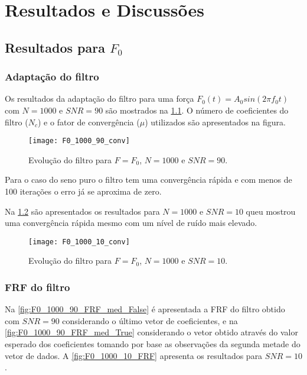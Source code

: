 \chapter{Resultados e Discussões}

\section{Resultados para $ F_0 $}\label{sec_F_0}
\subsection{Adaptação do filtro}

Os resultados da adaptação do filtro para uma força $F_0(t) = A_0 sin(2\pi f_0 t)$ com $ N=1000 $  e $ SNR = 90 $ são mostrados na \cref{fig:F0_1000_90_conv}. O número de coeficientes do filtro ($ N_c $) e o fator de convergência ($ \mu $) utilizados são apresentados na figura.

\begin{figure}[!h]
	\centering
	\texttt{[image: F0\_1000\_90\_conv]}
	\caption{Evolução do filtro para $ F=F_0 $, $ N=1000 $ e $ SNR=90 $.}
	\label{fig:F0_1000_90_conv}
\end{figure}

Para o caso do seno puro o filtro tem uma convergência rápida e com menos de 100 iterações o erro já se aproxima de zero. 

Na \cref{fig:F0_1000_10_conv} são apresentados os resultados para $ N=1000 $ e $ SNR=10 $ queu mostrou uma convergência rápida mesmo com um nível de ruído mais elevado.

\begin{figure}
	\centering
	\texttt{[image: F0\_1000\_10\_conv]}
	\caption{Evolução do filtro para $ F=F_0 $, $ N=1000 $ e $ SNR=10 $.}
	\label{fig:F0_1000_10_conv}
\end{figure}

\subsection{FRF do filtro}

Na \cref{fig:F0_1000_90_FRF_med_False} é apresentada a FRF do filtro obtido com $ SNR=90 $ considerando o último vetor de coeficientes, e na \cref{fig:F0_1000_90_FRF_med_True} considerando o vetor obtido através do valor esperado dos coeficientes tomando por base as observações da segunda metade do vetor de dados. A \cref{fig:F0_1000_10_FRF} apresenta os resultados para $ SNR=10 $. 

